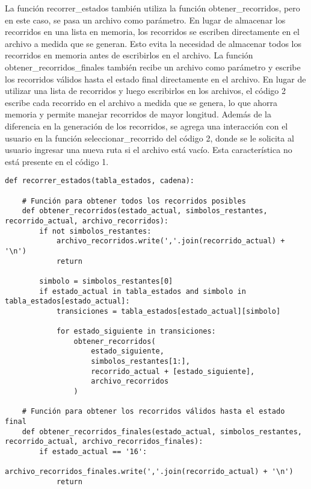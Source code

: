 \begin{enumerate}
\begin{enumerate}
La función recorrer\_estados también utiliza la función obtener\_recorridos, pero en este caso, se pasa un archivo como parámetro. En lugar de almacenar los recorridos en una lista en memoria, los recorridos se escriben directamente en el archivo a medida que se generan. Esto evita la necesidad de almacenar todos los recorridos en memoria antes de escribirlos en el archivo.\newline
La función obtener\_recorridos\_finales también recibe un archivo como parámetro y escribe los recorridos válidos hasta el estado final directamente en el archivo.
En lugar de utilizar una lista de recorridos y luego escribirlos en los archivos, el código 2 escribe cada recorrido en el archivo a medida que se genera, lo que ahorra memoria y permite manejar recorridos de mayor longitud.\newline
Además de la diferencia en la generación de los recorridos, se agrega una interacción con el usuario en la función seleccionar\_recorrido del código 2, donde se le solicita al usuario ingresar una nueva ruta si el archivo está vacío. Esta característica no está presente en el código 1.\newline




    
\end{enumerate}
\begin{lstlisting}
def recorrer_estados(tabla_estados, cadena):
    
    # Función para obtener todos los recorridos posibles
    def obtener_recorridos(estado_actual, simbolos_restantes, recorrido_actual, archivo_recorridos):
        if not simbolos_restantes:
            archivo_recorridos.write(','.join(recorrido_actual) + '\n')
            return

        simbolo = simbolos_restantes[0]
        if estado_actual in tabla_estados and simbolo in tabla_estados[estado_actual]:
            transiciones = tabla_estados[estado_actual][simbolo]

            for estado_siguiente in transiciones:
                obtener_recorridos(
                    estado_siguiente,
                    simbolos_restantes[1:],
                    recorrido_actual + [estado_siguiente],
                    archivo_recorridos
                )

    # Función para obtener los recorridos válidos hasta el estado final
    def obtener_recorridos_finales(estado_actual, simbolos_restantes, recorrido_actual, archivo_recorridos_finales):
        if estado_actual == '16':
            archivo_recorridos_finales.write(','.join(recorrido_actual) + '\n')
            return


\end{lstlisting}
\end{enumerate}
